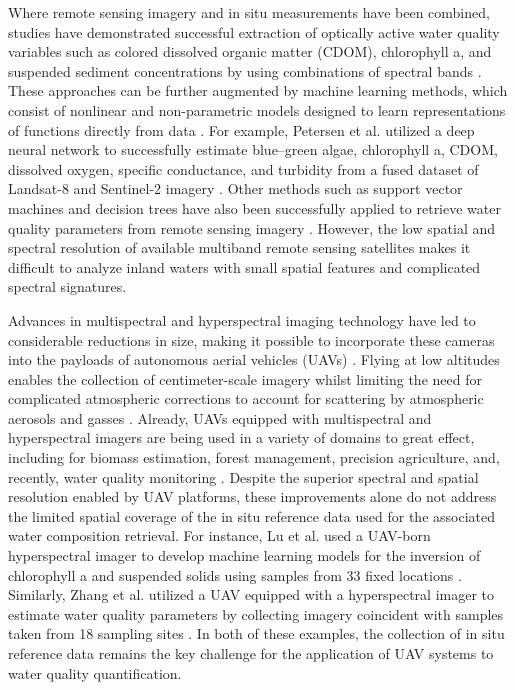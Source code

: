Where remote sensing imagery and in situ measurements have been combined,
studies have demonstrated successful extraction of optically active water
quality variables such as colored dissolved organic matter (CDOM),
chlorophyll a, and suspended sediment concentrations by using combinations of
spectral bands \cite{remote-sensing-finland,bonansea2015using,
  absalon2023detection}. These approaches can be further augmented by machine
learning methods, which consist of nonlinear and non-parametric models designed
to learn representations of functions directly from data
\cite{lary2010artificial}. For example, Petersen et al. utilized a deep neural
network to successfully estimate blue--green algae, chlorophyll a, CDOM,
dissolved oxygen, specific conductance, and turbidity from a fused dataset of
Landsat-8 and Sentinel-2 imagery \cite{peterson2020deep}. Other methods such as
support vector machines and decision trees have also been successfully applied
to retrieve water quality parameters from remote sensing imagery
\cite{belgiu2016random,sagan2020monitoring}. However, the low spatial and
spectral resolution of available multiband remote sensing satellites makes it
difficult to analyze inland waters with small spatial features and complicated
spectral signatures.


Advances in multispectral and hyperspectral imaging technology have led to
considerable reductions in size, making it possible to incorporate these cameras
into the payloads of autonomous aerial vehicles (UAVs)
\cite{hruska2012radiometric}. Flying at low altitudes enables the collection of
centimeter-scale imagery whilst limiting the need for complicated atmospheric
corrections to account for scattering by atmospheric aerosols and gasses
\cite{adao2017hyperspectral, banerjee2020uav}. Already, UAVs equipped with
multispectral and hyperspectral imagers are being used in a variety of domains
to great effect, including for biomass estimation, forest management, precision
agriculture, and, recently, water quality monitoring
\cite{adao2017hyperspectral,
  padua2017uas,arroyo2019implementation,kurihara2020unmanned,
  ehmann2019monitoring}. Despite the superior spectral and spatial resolution
enabled by UAV platforms, these improvements alone do not address the limited
spatial coverage of the in situ reference data used for the associated water
composition retrieval. For instance, Lu et al. used a UAV-born hyperspectral
imager to develop machine learning models for the inversion of chlorophyll a and
suspended solids using samples from 33 fixed locations \cite{lu2021retrieval}.
Similarly, Zhang et al. utilized a UAV equipped with a hyperspectral imager to
estimate water quality parameters by collecting imagery coincident with samples
taken from 18 sampling sites \cite{zhang2022selection}. In both of these
examples, the collection of in situ reference data remains the key challenge for
the application of UAV systems to water quality quantification.

